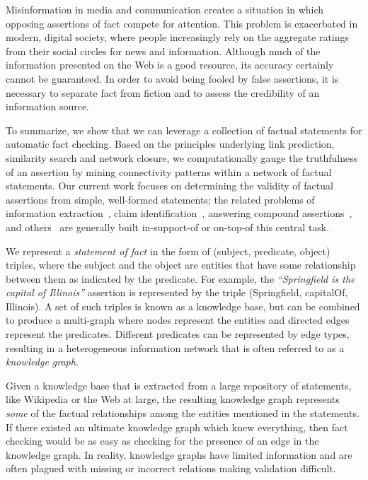 \documentclass[reprint,twocolumn,showpacs,preprintnumbers,amsmath, aps,pre,amssymb]{revtex4-1}
\newcommand{\ignore}[1]{}
\begin{document}
Misinformation in media and communication creates a situation in which opposing assertions of fact compete for attention. This problem is exacerbated in modern, digital society, where people increasingly rely on the aggregate ratings from their social circles for news and information. Although much of the information presented on the Web is a good resource, its accuracy certainly cannot be guaranteed. In order to avoid being fooled by false assertions, it is necessary to separate fact from fiction and to assess the credibility of an information source.

To summarize, we show that we can leverage a collection of factual statements for automatic fact checking. Based on the principles underlying link prediction, similarity search and network closure, we computationally gauge the truthfulness of an assertion by mining connectivity patterns within a network of factual statements. Our current work focuses on determining the validity of factual assertions from simple, well-formed statements; the related problems of information extraction~\cite{Etzioni2004}, claim identification~\cite{Hassan2015}, answering compound assertions~\cite{Wu2014}, and others~\cite{Nickel2015} are generally built in-support-of or on-top-of this central task.


We represent a \textit{statement of fact} in the form of (\textsf{subject}, \textsf{predicate}, \textsf{object}) triples, where the \textsf{subject} and the \textsf{object} are entities that have some relationship between them as indicated by the \textsf{predicate}. For example, the \textit{``Springfield is the capital of Illinois''} assertion is represented by the triple (\textsf{Springfield}, \textsf{capitalOf}, \textsf{Illinois}). A set of such triples is known as a knowledge base, but can be combined to produce a multi-graph where nodes represent the entities and directed edges represent the predicates. Different predicates can be represented by edge types, resulting in a heterogeneous information network that is often referred to as a \textit{knowledge graph}.

Given a knowledge base that is extracted from a large repository of statements, like Wikipedia or the Web at large, the resulting knowledge graph represents \emph{some} of the factual relationships among the entities mentioned in the statements. If there existed an ultimate knowledge graph which knew everything, then fact checking would be as easy as checking for the presence of an edge in the knowledge graph. In reality, knowledge graphs have limited information and are often plagued with missing or incorrect relations making validation difficult.
\end{document}
